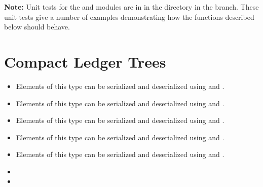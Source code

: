 
{\bf{Note:}} Unit tests for the {} and {} modules are in {}
in the {}
directory in the {} branch.
These unit tests give a number of examples demonstrating how the functions described below should behave.

\section{Compact Ledger Trees}



\begin{itemize}
\item {}
Elements of this type can be serialized and deserialized using
{}
and {}.
\item {}
Elements of this type can be serialized and deserialized using
{}
and
{}.
\item {}
Elements of this type can be serialized and deserialized using
{}
and
{}.
\item {}
Elements of this type can be serialized and deserialized using
{}
and
{}.
\item {}
Elements of this type can be serialized and deserialized using
{}
and
{}.
\end{itemize}

\begin{itemize}
\item {}
\item {}
\end{itemize}

{}


